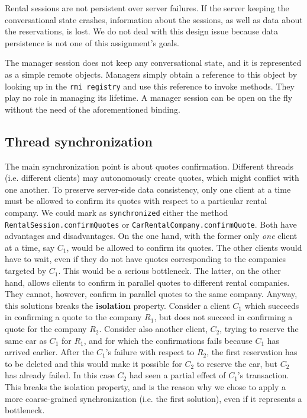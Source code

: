 Rental sessions are not persistent over server failures. If the server keeping the conversational state crashes, information about the sessions, as well as data about the reservations, is lost. We do not deal with this design issue because data persistence is not one of this assignment's goals. 

The manager session does not keep any conversational state, and it is represented as a simple remote objects. Managers simply obtain a reference to this object by looking up in the \texttt{rmi registry} and use this reference to invoke methods. They play no role in managing its lifetime. A manager session can be open on the fly without the need of the aforementioned binding.

\subsection{Thread synchronization}
The main synchronization point is about quotes confirmation. Different threads (i.e. different clients) may autonomously create quotes, which might conflict with one another. To preserve server-side data consistency, only one client at a time must be allowed to confirm its quotes with respect to a particular rental company. We could mark as \texttt{synchronized} either the method \texttt{RentalSession.confirmQuotes} or \texttt{CarRentalCompany.confirmQuote}. Both have advantages and disadvantages. On the one hand, with the former only \textit{one} client at a time, say $C_1$, would be allowed to confirm its quotes. The other clients would have to wait, even if they do not have quotes corresponding to the companies targeted by $C_1$. This would be a serious bottleneck. The latter, on the other hand, allows clients to confirm in parallel quotes to different rental companies. They cannot, however, confirm in parallel quotes to the same company. Anyway, this solutions breaks the \textbf{isolation} property. Consider a client $C_1$ which succeeds in confirming a quote to the company $R_1$, but does not succeed in confirming a quote for the company $R_2$. Consider also another client, $C_2$, trying to reserve the same car as $C_1$ for $R_1$, and for which the confirmations fails because $C_1$ has arrived earlier. After the $C_1$'s failure with respect to $R_2$, the first reservation has to be deleted and this would make it possible for $C_2$ to reserve the car, but $C_2$ has already failed. In this case $C_2$ had seen a partial effect of $C_1$'s transaction. This breaks the isolation property, and is the reason why we chose to apply a more coarse-grained synchronization (i.e. the first solution), even if it represents a bottleneck.

